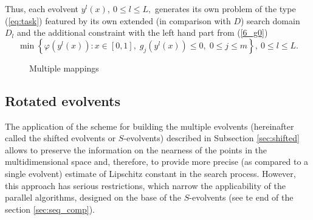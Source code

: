 \documentclass[runningheads]{llncs}
\begin{document}
Thus, each evolvent $y^l(x),\ 0\leq l \leq L,$ generates its own problem of the type (\ref{eq:task}) featured by its own extended (in comparison with $D$) search domain $D_l$ and the additional constraint with the left hand part from (\ref{6_g0})
\begin{equation}\label{6_problem_l}
\min{\left\{\varphi(y^l(x)):x\in [0,1], \; g_j(y^l(x))\leq 0, \; 0 \leq j \leq m\right\}}, \ 0 \leq l \leq L.
\end{equation}

\begin{figure}[ht]
    \centering
    \caption{Multiple mappings}
\end{figure}

\subsection{Rotated evolvents}
The application of the scheme for building the multiple evolvents (hereinafter called the shifted evolvents or $S$-evolvents) described in Subsection \ref{sec:shifted} allows to preserve the information on the nearness of the points in the multidimensional space and, therefore, to provide more precise (as compared to a single evolvent) estimate of Lipschitz constant in the search process. However, this approach has serious restrictions, which narrow the applicability of the parallel algorithms, designed on the base of the $S$-evolvents (see te end of the section \ref{sec:seq_comp}).
\end{document}
